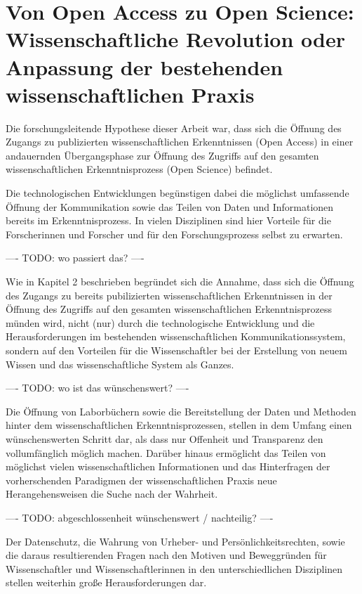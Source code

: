 \section{Von Open Access zu Open Science: Wissenschaftliche Revolution oder Anpassung der bestehenden wissenschaftlichen Praxis}

Die forschungsleitende Hypothese dieser Arbeit war, dass sich die Öffnung des Zugangs zu publizierten wissenschaftlichen Erkenntnissen (Open Access) in einer andauernden Übergangsphase zur Öffnung des Zugriffs auf den gesamten wissenschaftlichen Erkenntnisprozess (Open Science) befindet.

Die technologischen Entwicklungen begünstigen dabei die möglichst umfassende Öffnung der Kommunikation sowie das Teilen von Daten und Informationen bereits im Erkenntnisprozess. In vielen Disziplinen sind hier Vorteile für die Forscherinnen und Forscher und für den Forschungsprozess selbst zu erwarten.

---- TODO: wo passiert das? ----

Wie in Kapitel 2 beschrieben begründet sich die Annahme, dass sich die Öffnung des Zugangs zu bereits pubilizierten wissenschaftlichen Erkenntnissen in der Öffnung des Zugriffs auf den gesamten wissenschaftlichen Erkenntnisprozess münden wird, nicht (nur) durch die technologische Entwicklung und die Herausforderungen im bestehenden wissenschaftlichen Kommunikationssystem, sondern auf den Vorteilen für die Wissenschaftler bei der Erstellung von neuem Wissen und das wissenschaftliche System als Ganzes.

---- TODO: wo ist das wünschenswert? ----

Die Öffnung von Laborbüchern sowie die Bereitstellung der Daten und Methoden hinter dem wissenschaftlichen Erkenntnisprozessen, stellen in dem Umfang einen wünschenswerten Schritt dar, als dass nur Offenheit und Transparenz den vollumfänglich möglich machen. Darüber hinaus ermöglicht das Teilen von möglichst vielen wissenschaftlichen Informationen und das Hinterfragen der vorherschenden Paradigmen der wissenschaftlichen Praxis neue Herangehensweisen die Suche nach der Wahrheit.

---- TODO: abgeschlossenheit wünschenswert / nachteilig? ----

Der Datenschutz, die Wahrung von Urheber- und Persönlichkeitsrechten, sowie die daraus resultierenden Fragen nach den Motiven und Beweggründen für Wissenschaftler und Wissenschaftlerinnen in den unterschiedlichen Disziplinen stellen weiterhin große Herausforderungen dar.

